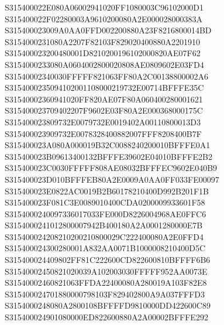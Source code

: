 \documentclass[12pt,a4paper]{article}
\begin{document}
\begin{framed}
{S315400022E080A06002941020FF1080003C96102000D1\newline
S315400022F02280003A9610200080A2E000028000383A\newline
S315400023009A0AA0FFD002200880A23F8216800014BD\newline
S3154000231080A2207F82103F829020400880A2201910\newline
S315400023200480001D8210200196102000820AE07F62\newline
S3154000233080A0604002800020808AE0809602E03FD4\newline
S31540002340030FFFFF821063FF80A2C00138800002A6\newline
S3154000235094102001108000219732E00714BFFFE35C\newline
S31540002360941020FF820AE07F80A060400280001621\newline
S315400023709402207F9602E03F80A2E000368000175C\newline
S315400023809732E0079732E0019402A00110800013D3\newline
S315400023909732E0078328400882007FFF8208400B7F\newline
S315400023A080A000019B32C0088240200010BFFFE0A1\newline
S315400023B09613400132BFFFE39602E04010BFFFE2B2\newline
S315400023C0030FFFFF808AE08032BFFFEC9602E040B9\newline
S315400023D010BFFFEB80A2E0009A0AA0FF033FE00097\newline
S315400023E0822AC0019B2B60178210400D992B201F1B\newline
S315400023F081C3E0089010400CDA0200009933601F58\newline
S3154000240097336017033FE000D8226004968AE0FFC6\newline
S3154000241012800007942B400180A2A0001280000E7B\newline
S315400024208210200210800029C222400080A2E0FFD4\newline
S315400024300280001A832AA0071B1000008210400D5C\newline
S315400024409802FF81C222600CD822600810BFFFF6B6\newline
S31540002450821020039A102003030FFFFF952AA0073E\newline
S31540002460821063FFDA22400080A280019A103F82E8\newline
S315400024701880000798103F829402800A9A037FFFD3\newline
S3154000248080A2800108BFFFFD9810000DD422600C89\newline
S315400024901080000ED822600880A2A00002BFFFE292\newline
}
\end{framed}
\end{document}
